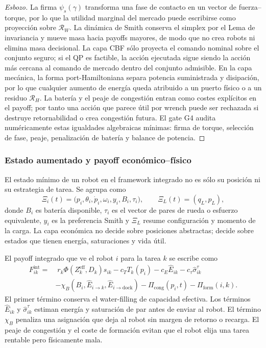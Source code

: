 \begin{proof}[Esbozo]
La firma $\psi_s(\gamma)$ transforma una fase de contacto en un vector de fuerza--torque,
por lo que la utilidad marginal del mercado puede escribirse como proyección sobre
$\mathcal R_W$. La dinámica de Smith conserva el simplex por el Lema de invariancia y
mueve masa hacia payoffs mayores, de modo que no crea robots ni elimina masa decisional.
La capa CBF sólo proyecta el comando nominal sobre el conjunto seguro; si el QP es
factible, la acción ejecutada sigue siendo la acción más cercana al comando de mercado
dentro del conjunto admisible. En la capa mecánica, la forma port-Hamiltoniana separa
potencia suministrada y disipación, por lo que cualquier aumento de energía queda
atribuido a un puerto físico o a un residuo $\mathcal R_H$. La batería y el peaje de
congestión entran como costes explícitos en el payoff; por tanto una acción que parece
útil por wrench puede ser rechazada si destruye retornabilidad o crea congestión futura.
El gate G4 audita numéricamente estas igualdades algebraicas mínimas: firma de torque,
selección de fase, peaje, penalización de batería y balance de potencia.
\end{proof}

\subsubsection{Estado aumentado y payoff económico--físico}

El estado mínimo de un robot en el framework integrado no es sólo su posición ni su
estrategia de tarea. Se agrupa como
\begin{equation}
  \Xi_i(t)=
  \bigl(p_i,\theta_i,\dot p_i,\omega_i,y_i,B_i,\tau_i\bigr),
  \qquad
  \Xi_L(t)=(q_L,p_L),
  \label{eq:estado_integrado}
\end{equation}
donde $B_i$ es batería disponible, $\tau_i$ es el vector de pares de rueda o esfuerzo
equivalente, $y_i$ es la preferencia Smith y $\Xi_L$ resume configuración y momento de
la carga. La capa económica no decide sobre posiciones abstractas; decide sobre estados
que tienen energía, saturaciones y vida útil.

El payoff integrado que ve el robot $i$ para la tarea $k$ se escribe como
\begin{equation}
\begin{aligned}
  F_{ik}^{\mathrm{int}}
  =&\;
  r_k\Phi\!\left(Z_k^{\mathrm{eff}},D_k\right)s_{ik}
  -c_TT_k(p_i)
  -c_E\widehat E_{ik}
  -c_\tau\widehat\sigma_{ik}^{\tau} \\
  &-
  \chi_B(B_i,\widehat E_{i\to k},\widehat E_{i\to\mathrm{dock}})
  -\Pi_{\mathrm{cong}}(p_i,t)
  -\Pi_{\mathrm{form}}(i,k).
\end{aligned}
\label{eq:payoff_integrado}
\end{equation}
El primer término conserva el water-filling de capacidad efectiva. Los términos
$\widehat E_{ik}$ y $\widehat\sigma_{ik}^{\tau}$ estiman energía y saturación de par
antes de enviar al robot. El término $\chi_B$ penaliza una asignación que deja al robot
sin margen de retorno o recarga. El peaje de congestión y el coste de formación evitan
que el robot elija una tarea rentable pero físicamente mala.

